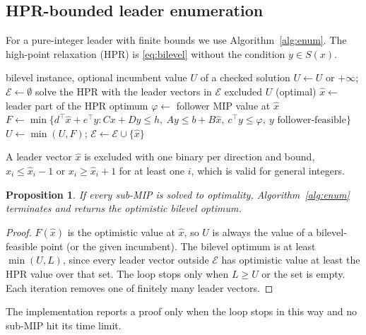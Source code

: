\documentclass[11pt]{article}
\newtheorem{proposition}{Proposition}
\begin{document}
\subsection{HPR-bounded leader enumeration}
\label{sec:enum}

For a pure-integer leader with finite bounds we use
Algorithm~\ref{alg:enum}. The high-point relaxation (HPR) is
\eqref{eq:bilevel} without the condition $y \in S(x)$.

\begin{algorithm}[t]
\caption{HPR-bounded leader enumeration}
\label{alg:enum}
\begin{algorithmic}[1]
\REQUIRE bilevel instance, optional incumbent value $U$ of a checked solution
\STATE $U \leftarrow U$ or $+\infty$; $\mathcal{E} \leftarrow \emptyset$
\LOOP
  \STATE solve the HPR with the leader vectors in $\mathcal{E}$ excluded
   \RETURN $U$ (optimal) \ENDIF
  \STATE $\hat{x} \leftarrow$ leader part of the HPR optimum
  \STATE $\varphi \leftarrow$ follower MIP value at $\hat{x}$
  \STATE $F \leftarrow \min\{d^\top\hat{x} + e^\top y : Cx + Dy \le h,\ Ay \le b + B\hat{x},\ c^\top y \le \varphi,\ y \text{ follower-feasible}\}$
  \STATE $U \leftarrow \min(U, F)$; $\mathcal{E} \leftarrow \mathcal{E} \cup \{\hat{x}\}$
\ENDLOOP
\end{algorithmic}
\end{algorithm}

A leader vector $\hat{x}$ is excluded with one binary per direction and bound,
$x_i \le \hat{x}_i - 1$ or $x_i \ge \hat{x}_i + 1$ for at least one $i$, which
is valid for general integers.

\begin{proposition}
If every sub-MIP is solved to optimality, Algorithm~\ref{alg:enum}
terminates and returns the optimistic bilevel optimum.
\end{proposition}
\begin{proof}
$F(\hat{x})$ is the optimistic value at $\hat{x}$, so $U$ is always the value
of a bilevel-feasible point (or the given incumbent). The bilevel optimum is
at least $\min(U, L)$, since every leader vector outside $\mathcal{E}$ has
optimistic value at least the HPR value over that set. The loop stops only
when $L \ge U$ or the set is empty. Each iteration removes one of finitely
many leader vectors.
\end{proof}
The implementation reports a proof only when the loop stops in this way and
no sub-MIP hit its time limit.
\end{document}
